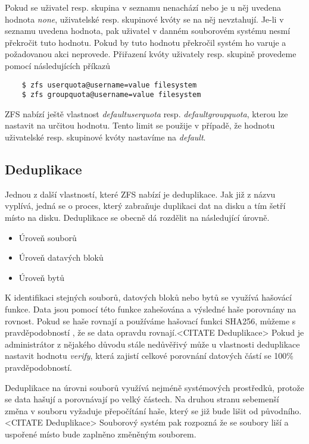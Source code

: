     Pokud se uživatel resp. skupina v seznamu nenachází nebo je u něj uvedena hodnota \emph{none}, uživatelské resp. skupinové kvóty se na něj nevztahují. Je-li v seznamu uvedena hodnota, pak uživatel v danném souborovém systému nesmí překročit tuto hodnotu. Pokud by tuto hodnotu překročil systém ho varuje a požadovanou akci neprovede. Přiřazení kvóty uživately resp. skupině provedeme pomocí následujících příkazů
    \begin{verbatim}
    $ zfs userquota@username=value filesystem
    $ zfs groupquota@username=value filesystem
    \end{verbatim}

    ZFS nabízí ještě vlastnost \emph{defaultuserquota} resp. \emph{defaultgroupquota}, kterou lze nastavit na určitou hodnotu. Tento limit se použije v případě, že hodnotu uživatelské resp. skupinové kvóty nastavíme na \emph{default}.
    \subsection{Deduplikace}
    \label{dedup}
    Jednou z další vlastností, které ZFS nabízí je deduplikace. Jak již z názvu vyplívá, jedná se o proces, který zabraňuje duplikaci dat na disku a tím šetří místo na disku. Deduplikace se obecně dá rozdělit na následující úrovně.
    \begin{itemize}
      \item Úroveň souborů
      \item Úroveň datavých bloků
      \item Úroveň bytů
    \end{itemize}

    K identifikaci stejných souborů, datových bloků nebo bytů se využívá hašovácí funkce. Data jsou pomocí této funkce zahešována a výsledné haše porovnány na rovnost. Pokud se haše rovnají a používáme hašovací funkci SHA256, můžeme s pravděpodobností , že se data opravdu rovnají.<CITATE Deduplikace> Pokud je administrátor z nějakého důvodu stále nedůvěřivý může u vlastnosti deduplikace nastavit hodnotu \emph{verify}, která zajistí celkové porovnání datových částí se 100\% pravděpodobností.

    Deduplikace na úrovni souborů využívá nejméně systémových prostředků, protože se data hašují a porovnávají po velký částech. Na druhou stranu sebemenší změna v souboru vyžaduje přepočítání haše, který se již bude lišit od původního.<CITATE Deduplikace> Souborový systém pak rozpozná že se soubory liší a uspořené místo bude zaplněno změněným souborem.

